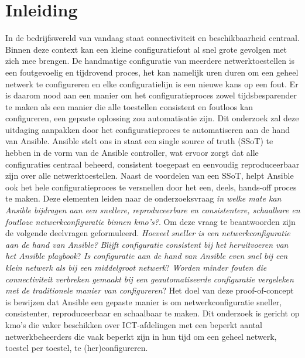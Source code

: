 


% 

\section{Inleiding}%
\label{sec:inleiding}

In de bedrijfswereld van vandaag staat connectiviteit en beschikbaarheid centraal. Binnen deze context kan een kleine configuratiefout al snel grote gevolgen met zich mee brengen. De handmatige configuratie van meerdere netwerktoestellen is een foutgevoelig en tijdrovend proces, het kan namelijk uren duren om een geheel netwerk te configureren en elke configuratielijn is een nieuwe kans op een fout.
Er is daarom nood aan een manier om het configuratieproces zowel tijdsbesparender te maken als een manier die alle toestellen consistent en foutloos kan configureren, een gepaste oplossing zou automatisatie zijn.
Dit onderzoek zal deze uitdaging aanpakken door het configuratieproces te automatiseren aan de hand van Ansible. Ansible stelt ons in staat een single source of truth (SSoT) te hebben in de vorm van de Ansible controller, wat ervoor zorgt dat alle configuraties centraal beheerd, consistent toegepast en eenvoudig reproduceerbaar zijn over alle netwerktoestellen.
Naast de voordelen van een SSoT, helpt Ansible ook het hele configuratieproces te versnellen door het een, deels, hands-off proces te maken.
Deze elementen leiden naar de onderzoeksvraag \textit{in welke mate kan Ansible bijdragen aan een snellere, reproduceerbare en consistentere, schaalbare en foutloze netwerkconfiguratie binnen kmo's?}.
Om deze vraag te beantwoorden zijn de volgende deelvragen geformuleerd. \textit{Hoeveel sneller is een netwerkconfiguratie aan de hand van Ansible?} \textit{Blijft configuratie consistent bij het heruitvoeren van het Ansible playbook}? \textit{Is configuratie aan de hand van Ansible even snel bij een klein netwerk als bij een middelgroot netwerk}? \textit{Worden minder fouten die connectiviteit verbreken gemaakt bij een geautomatiseerde configuratie vergeleken met de traditionele manier van configureren}?
Het doel van deze proof-of-concept is bewijzen dat Ansible een gepaste manier is om netwerkconfiguratie sneller, consistenter, reproduceerbaar en schaalbaar te maken.
Dit onderzoek is gericht op kmo's die vaker beschikken over ICT-afdelingen met een beperkt aantal netwerkbeheerders die vaak beperkt zijn in hun tijd om een geheel netwerk, toestel per toestel, te (her)configureren.


